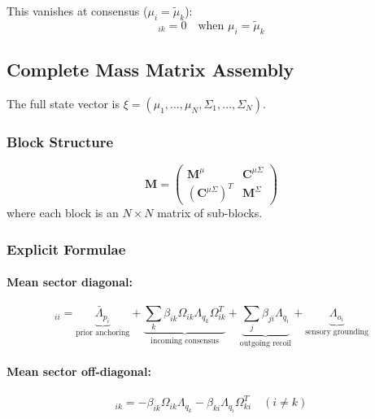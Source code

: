 \documentclass[12pt]{article}
\begin{document}
This vanishes at consensus ($\mu_i = \tilde{\mu}_k$):
\begin{equation}
[\mathbf{C}^{\mu\Sigma}]_{ik} = 0 \quad \text{when } \mu_i = \tilde{\mu}_k
\end{equation}

\subsection{Complete Mass Matrix Assembly}

The full state vector is $\xi = (\mu_1, \ldots, \mu_N, \Sigma_1, \ldots, \Sigma_N)$.

\subsubsection{Block Structure}

\begin{equation}
\mathbf{M} = \begin{pmatrix} \mathbf{M}^\mu & \mathbf{C}^{\mu\Sigma} \\ (\mathbf{C}^{\mu\Sigma})^T & \mathbf{M}^\Sigma \end{pmatrix}
\end{equation}
where each block is an $N \times N$ matrix of sub-blocks.

\subsubsection{Explicit Formulae}

\paragraph{Mean sector diagonal:}
\begin{equation}
[\mathbf{M}^\mu]_{ii} = \underbrace{\bar{\Lambda}_{p_i}}_{\text{prior anchoring}} + \underbrace{\sum_k \beta_{ik}\Omega_{ik}\Lambda_{q_k}\Omega_{ik}^T}_{\text{incoming consensus}} + \underbrace{\sum_j \beta_{ji}\Lambda_{q_i}}_{\text{outgoing recoil}} + \underbrace{\Lambda_{o_i}}_{\text{sensory grounding}}
\label{eq:mass_full_diagonal}
\end{equation}

\paragraph{Mean sector off-diagonal:}
\begin{equation}
[\mathbf{M}^\mu]_{ik} = -\beta_{ik}\Omega_{ik}\Lambda_{q_k} - \beta_{ki}\Lambda_{q_i}\Omega_{ki}^T \quad (i \neq k)
\end{equation}
\end{document}

